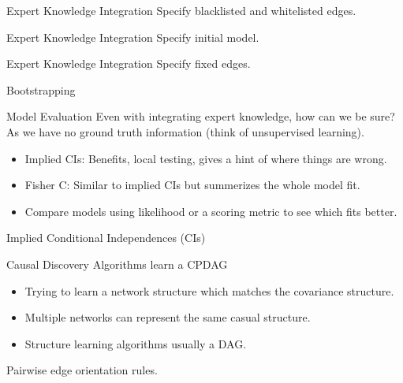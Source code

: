 \documentclass{beamer}
\begin{document}
\begin{frame}{Expert Knowledge Integration}
	Specify blacklisted and whitelisted edges.
\end{frame}

\begin{frame}{Expert Knowledge Integration} 
	Specify initial model.
\end{frame}

\begin{frame}{Expert Knowledge Integration}
	Specify fixed edges.
\end{frame}

\begin{frame}{Bootstrapping}
\end{frame}

\begin{frame}{Model Evaluation}
	Even with integrating expert knowledge, how can we be sure? 
	As we have no ground truth information (think of unsupervised learning).
	
	\begin{itemize}
		\item Implied CIs: Benefits, local testing, gives a hint of where things are wrong.
		\item Fisher C: Similar to implied CIs but summerizes the whole model fit.
		\item Compare models using likelihood or a scoring metric to see which fits better.
	\end{itemize}
\end{frame}

\begin{frame}{Implied Conditional Independences (CIs)}

\end{frame}

\begin{frame}{Causal Discovery Algorithms learn a CPDAG}
	\begin{figure}
	\end{figure}
	
	\begin{itemize}
		\item Trying to learn a network structure which matches the covariance
			structure.
		\item Multiple networks can represent the same casual structure.
		\item Structure learning algorithms usually a DAG.
	\end{itemize}

	Pairwise edge orientation rules.
\end{frame}
\end{document}
